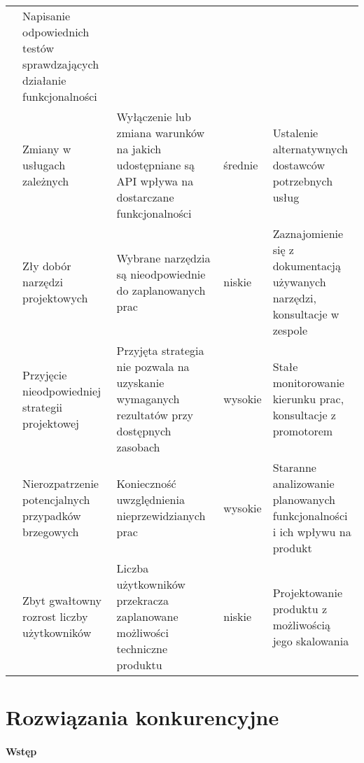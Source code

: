 \begin{longtable}{|p{.1\linewidth}|p{}|p{}|p{}|p{}|}
    & Napisanie odpowiednich testów sprawdzających działanie funkcjonalności \\
    \cline{2-5}
    & Zmiany w usługach zależnych & Wyłączenie lub zmiana warunków na jakich udostępniane są API wpływa na dostarczane funkcjonalności & średnie
    & Ustalenie alternatywnych dostawców potrzebnych usług \\
    \cline{2-5}
    & Zły dobór narzędzi projektowych & Wybrane narzędzia są nieodpowiednie do zaplanowanych prac & niskie
    & Zaznajomienie się z dokumentacją używanych narzędzi, konsultacje w zespole \\
    \hline
    \pagebreak
    \hline
    \multirow{2}{=}{\parbox[c]{3.5cm}{}} & Przyjęcie nieodpowiedniej strategii projektowej & Przyjęta strategia nie pozwala na uzyskanie wymaganych rezultatów przy dostępnych zasobach & wysokie
    & Stałe monitorowanie kierunku prac, konsultacje z promotorem \\
    \cline{2-5}
    & Nierozpatrzenie potencjalnych przypadków brzegowych & Konieczność uwzględnienia nieprzewidzianych prac & wysokie
    & Staranne analizowanie planowanych funkcjonalności i ich wpływu na produkt \\
    \hline
    \multirow{1}{=}{\parbox[c]{4cm}{}}& Zbyt gwałtowny rozrost liczby użytkowników & Liczba użytkowników przekracza zaplanowane możliwości techniczne produktu & niskie
    & Projektowanie produktu z możliwością jego skalowania \\
    \hline

\end{longtable}
\pagebreak
\section{Rozwiązania konkurencyjne}
\label{sec:rozwiazania-konkurencyjne}

\paragraph{Wstęp}

